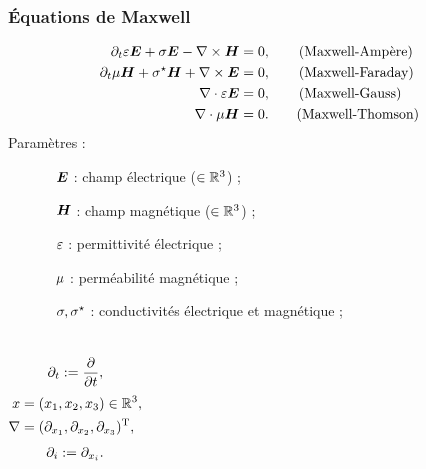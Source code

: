 \begin{frame}
\frametitle{Équations de Maxwell}
\vfill
\begin{align*}
	\partial_{t} \varepsilon \bm{E} + \sigma \bm{E} - \nabla\times \bm{H} &= 0 ,
	\tag{Maxwell-Ampère}
	\\
	\partial_{t} \mu \bm{H} + \sigma^\star \bm{H} + \nabla\times \bm{E} &= 0 ,
	\tag{Maxwell-Faraday}
	\\
	\nabla\cdot \varepsilon \bm{E} &= 0 ,
	\tag{Maxwell-Gauss}
	\\
	\nabla\cdot \mu \bm{H} &= 0 .
	\tag{Maxwell-Thomson}
\end{align*}
\vfill
Paramètres :
\begin{itemize}
\item[]
\begin{itemize}
\item [$\bm{E}$] : champ électrique ($\in \mathbb{R}^{3}$) ;
\item [$\bm{H}$] : champ magnétique ($\in \mathbb{R}^{3}$) ;
\item [$\varepsilon$] : permittivité électrique ;
\item [$\mu$] : perméabilité magnétique ;
\item [$\sigma,\sigma^\star$] : conductivités électrique et magnétique ;
\end{itemize}
\end{itemize}
\vfill
\begin{columns}
\begin{align*}
\partial_{t} := \frac{\partial}{\partial t} ,
\end{align*}
\begin{align*}
x &= \left({x}_1,{x}_2,{x}_3\right) \in \mathbb{R}^{3}, \\
\nabla &= (\partial_{x_1}, \partial_{x_2}, \partial_{x_3})^{\mathrm{T}} ,
\end{align*}
\begin{align*}
\partial_{i} := \partial_{x_i} .
\end{align*}
\end{columns}
\vfill
\end{frame}

